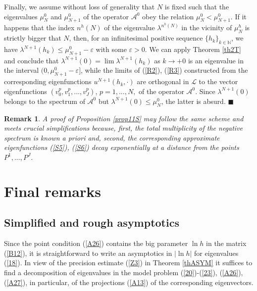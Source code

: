 \documentclass[11pt]{article}%
\newtheorem{remark}[theorem]{Remark}
\numberwithin{equation}{section}
\begin{document}
Finally, we assume without loss of generality that $N$ is fixed such that the
eigenvalues $\mu_{N}^{0}$ and $\mu_{N+1}^{0}$ of the operator $\mathcal{A}%
^{0}$ obey the relation $\mu_{N}^{0}<\mu_{N+1}^{0}$. If it happens that the
index $n^{h}(N)$ of the eigenvalue $\lambda^{n^{h}(N)}$ in the vicinity of
$\mu_{N}^{h}$ is strictly bigger that $N$, then, for an infinitesimal positive
sequence $\{h_{k}\}_{k\in\mathbb{N}}$, we have $\lambda^{N+1}(h_{k})\leq
\mu_{N+1}^{0}-\varepsilon$ with some $\varepsilon>0$. We can apply Theorem
\ref{th2T} and conclude that $\lambda^{N+1}(0)=\lim\lambda^{N+1}(h_{k})$ as
$k\rightarrow+0$ is an eigenvalue in the interval $(0,\mu_{N+1}^{0}%
-\varepsilon]$, while the limits of (\ref{R2}), (\ref{R3}) constructed from
the corresponding eigenfunctions $u^{N+1}(h_{k},\cdot)$ are orthogonal in
$\mathcal{L}$ to the vector eigenfunctions $(v_{0}^{p},v_{1}^{p},...,v_{J}%
^{p})$, $p=1,...,N,$ of the operator $\mathcal{A}^{0}$. Since $\lambda
^{N+1}(0)$ belongs to the spectrum of $\mathcal{A}^{0}$ but $\lambda
^{N+1}(0)\leq\mu_{N}^{0}$, the latter is absurd. $\blacksquare$

\begin{remark}
\label{remNEGA}A proof of Proposition \ref{prop11S} may follow the same scheme
and meets crucial simplifications because, first, the total multiplicity of
the negative spectrum is known a priori and, second, the corresponding
approximate eigenfunctions (\ref{S5}), (\ref{S6}) decay exponentially at a
distance from the points $P^{1},...,P^{J}$.
\end{remark}

\section{Final remarks\label{sect5}}

\subsection{Simplified and rough asymptotics\label{sect5.1}}

Since the point condition (\ref{A26}) contains the big parameter $\ln h$ in
the matrix (\ref{B12}), it is straightforward to write an asymptotics in $|\ln
h|$ for eigenvalues (\ref{18}). In view of the precision estimate (\ref{Z3})
in Theorem \ref{thASYM} it suffices to find a decomposition of eigenvalues in
the model problem (\ref{20})-(\ref{23}), (\ref{A26}), (\ref{A27}), in
particular, of the projections (\ref{A13}) of the corresponding eigenvectors.
\end{document}
